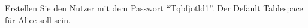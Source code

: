     \item Erstellen Sie den Nutzer  mit dem Passwort \enquote{Tqbfjotld1}. Der Default Tablespace f\"ur Alice soll  sein.
